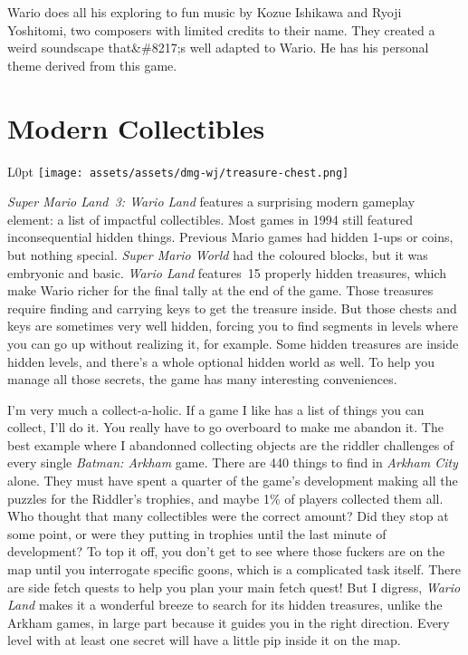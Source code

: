 \documentclass{book}
\begin{document}
Wario does all his exploring to fun music by Kozue Ishikawa and Ryoji Yoshitomi, two composers with limited credits to their name. They created a weird soundscape that&\#8217;s well adapted to Wario. He has his personal theme derived from this game.

\FloatBarrier\needspace{10mm}\section*{Modern Collectibles}\nopagebreak[4]

\begin{wrapfigure}{L}{0pt} \texttt{[image: assets/assets/dmg-wj/treasure-chest.png]}\end{wrapfigure}

\emph{Super Mario Land 3: Wario Land} features a surprising modern gameplay element: a list of impactful collectibles. Most games in 1994 still featured inconsequential hidden things. Previous Mario games had hidden 1-ups or coins, but nothing special. \emph{Super Mario World} had the coloured blocks, but it was embryonic and basic. \emph{Wario Land} features 15 properly hidden treasures, which make Wario richer for the final tally at the end of the game. Those treasures require finding and carrying keys to get the treasure inside. But those chests and keys are sometimes very well hidden, forcing you to find segments in levels where you can go up without realizing it, for example. Some hidden treasures are inside hidden levels, and there’s a whole optional hidden world as well. To help you manage all those secrets, the game has many interesting conveniences.

I’m very much a collect-a-holic. If a game I like has a list of things you can collect, I’ll do it. You really have to go overboard to make me abandon it. The best example where I abandonned collecting objects are the riddler challenges of every single \emph{Batman: Arkham} game. There are 440 things to find in \emph{Arkham City} alone. They must have spent a quarter of the game’s development making all the puzzles for the Riddler’s trophies, and maybe 1\% of players collected them all. Who thought that many collectibles were the correct amount? Did they stop at some point, or were they putting in trophies until the last minute of development? To top it off, you don’t get to see where those fuckers are on the map until you interrogate specific goons, which is a complicated task itself. There are side fetch quests to help you plan your main fetch quest! But I digress, \emph{Wario Land} makes it a wonderful breeze to search for its hidden treasures, unlike the Arkham games, in large part because it guides you in the right direction. Every level with at least one secret will have a little pip inside it on the map.
\end{document}
